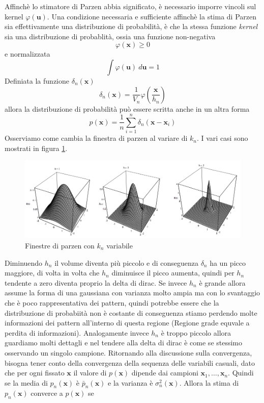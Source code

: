 \noindent Affinchè lo stimatore di Parzen abbia significato, è necessario imporre vincoli sul kernel $\varphi(\mathbf{u})$. Una condizione necessaria e sufficiente affinchè la stima di Parzen sia effettivamente una distribuzione di probabilità, è che la stessa funzione \emph{kernel} sia una distribuzione di probablità, ossia una funzione non-negativa
\begin{equation}
\varphi(\mathbf{x}) \geq 0
\end{equation}
e normalizzata
\begin{equation}
\int \varphi(\mathbf{u}) \ d\mathbf{u} = 1
\end{equation}
Definiata la funzione $\delta_n(\mathbf{x})$
\begin{equation}
\delta_n(\mathbf{x}) = \frac{1}{V_n} \varphi \left ( \frac{\mathbf{x}}{h_n} \right )
\end{equation}
allora la distribuzione di probabilità può essere scritta anche in un altra forma
\begin{equation}
p(\mathbf{x}) = \frac{1}{n} \sum_{i=1}^n \delta_n(\mathbf{x} - \mathbf{x}_i)
\end{equation}
Osserviamo come cambia la finestra di parzen al variare di $k_n$. I vari casi sono mostrati in figura \ref{parzen}.
\begin{figure}
\centering
\includegraphics[scale=0.4]{img/parzen.png}
\caption{Finestre di parzen con $k_n$ variabile}
\label{parzen}
\end{figure}
Diminuendo $h_n$ il volume diventa più piccolo e di conseguenza $\delta_n$ ha un picco maggiore, di volta in volta che $h_n$ diminuisce il picco aumenta, quindi per $h_n$ tendente a zero diventa proprio la delta di dirac. Se invece $h_n$ è grande allora assume la forma di una gaussiana con varianza molto ampia ma con lo svantaggio che è poco rappresentativa dei pattern, quindi potrebbe essere che la distribuzione di probabiità non è costante di conseguenza stiamo perdendo molte informazioni dei pattern all'interno di questa regione (Regione grade equvale a perdita di informazioni). Analogamente invece $h_n$ è troppo piccolo allora guardiamo molti dettagli e nel tendere alla delta di dirac è come se stessimo osservando un singolo campione. Ritornando alla discussione sulla convergenza, bisogna tener conto della convergenza della sequenza delle variabili casuali, dato che per ogni fissato $\mathbf{x}$ il valore di $p(\mathbf{x})$ dipende dai campioni $\mathbf{x}_1, \dots, \mathbf{x}_n$. Quindi se la media di $p_n(\mathbf{x})$ è $\bar{p}_n(\mathbf{x})$ e la varianza è $\sigma^2_n(\mathbf{x})$. Allora la stima di $p_n(\mathbf{x})$ converce a $p(\mathbf{x})$ se
